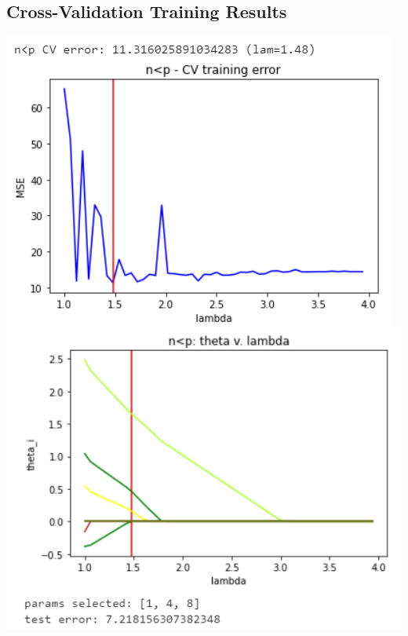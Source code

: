 \documentclass[11pt]{article}
\begin{document}
\subsection{Cross-Validation Training Results}
\label{cvtr}
\begin{center}
\includegraphics[scale=0.7]{charts/lasso_ortho_n_lt_p_err.PNG}
\includegraphics[scale=0.7]{charts/lasso_ortho_n_lt_p_thetas.PNG}


\end{center}
\end{document}
